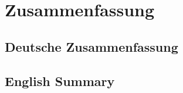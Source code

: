 \chapter{Zusammenfassung}
\label{chap:zusammenfassung}

\section*{Deutsche Zusammenfassung}

\section*{English Summary}